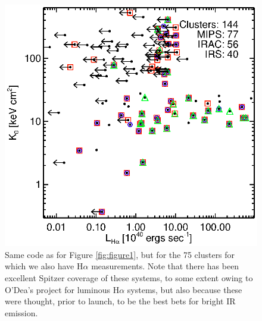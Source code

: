 \documentclass[letterpaper,12pt]{article}
\begin{document}
\begin{figure}[t]
\begin{minipage}[t]{0.5\linewidth}
        \includegraphics*[width=\textwidth, trim=28mm 10mm 30mm 17mm, clip]{spitzer_hak0}
        \caption{\small Same code as for Figure \ref{fig:figure1}, but for the 75 clusters for which we also have
        H$\alpha$ measurements. Note that there has been excellent Spitzer coverage of
        these systems, to some extent owing to O'Dea's project for luminous
        H$\alpha$ systems, but also because these were thought, prior to launch, to be
        the best bets for bright IR emission.}
        \label{fig:figure2}
    \end{minipage}
\end{figure}
\end{document}
